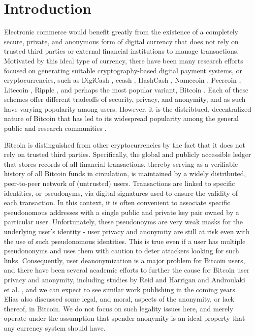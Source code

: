 \section{Introduction}

Electronic commerce would benefit greatly from the existence of a completely secure, private, and anonymous form of digital currency that does not rely on trusted third parties or external financial institutions to manage transactions. Motivated by this ideal type of currency, there have been many research efforts focused on generating suitable cryptography-based digital payment systems, or cryptocurrencies, such as DigiCash \cite{digicash}, ecash \cite{ecash}, HashCash \cite{hashcash}, Namecoin \cite{namecoin}, Peercoin \cite{peercoin}, Litecoin \cite{litecoin}, Ripple \cite{ripple}, and perhaps the most popular variant, Bitcoin \cite{bitcoin}. Each of these schemes offer different tradeoffs of security, privacy, and anonymity, and as such have varying popularity among users. However, it is the distribtued, decentralized nature of Bitcoin that has led to its widespread popularity among the general public and research communities \cite{news articles}. 

Bitcoin is distinguished from other cryptocurrencies by the fact that it does not rely on trusted third parties. Specifically, the global and publicly accessible ledger that stores records of all financial transactions, thereby serving as a verifiable history of all Bitcoin funds in circulation, is maintained by a widely distributed, peer-to-peer network of (untrusted) users. Transactions are linked to specific identities, or pseudonyms, via digital signatures used to ensure the validity of each transaction. In this context, it is often convenient to associate specific pseudonomous addresses with a single public and private key pair owned by a particular user. Unfortunately, these pseudonoyms are very weak masks for the underlying user's identity - user privacy and anonymity are still at risk even with the use of such pseudonomous identities. This is true even if a user has multiple pseudononyms and uses them with caution to deter attackers looking for such links. Consequently, user deanonymization is a major problem for Bitcoin users, and there have been several academic efforts to further the cause for Bitcoin user privacy and anonymity, including studies by Reid and Harrigan \cite{ReidHarrigan13} and Androulaki et al. \cite{Androulaki12-privacy}, and we can expect to see similar work publishing in the coming years. Elias \cite{8} also discussed some legal, and moral, aspects of the anonymity, or lack thereof, in Bitcoin. We do not focus on such legality issues here, and merely operate under the assumption that spender anonymity is an ideal property that any currency system should have.


